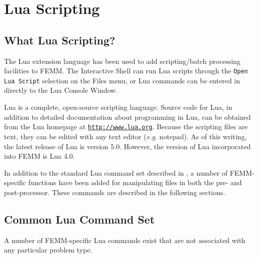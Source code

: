 %

\chapter{Lua Scripting}

\section{What Lua Scripting?}

The Lua extension language has been used to add scripting/batch
processing facilities to FEMM. The Interactive Shell can run Lua scripts
through the {\tt Open Lua Script} selection on the Files menu, or Lua commands can be
entered in directly to the Lua Console Window.

Lua is a complete, open-source scripting language.  Source code for
Lua, in addition to detailed documentation about programming in
Lua, can be obtained from the Lua homepage at
\href{http://www.lua.org}{\tt http://www.lua.org}. 
Because the
scripting files are text, they can be edited with any text editor
({\em e.g.} notepad). As of this writing, the latest release of Lua
is version 5.0. However, the version of Lua incorporated into FEMM
is Lua 4.0.

In addition to the standard Lua command set described in \cite{luaman}, a number of
FEMM-specific functions have been added for manipulating files in
both the pre- and post-processor.  These commands are described in
the following sections.

\section{Common Lua Command Set}

A number of FEMM-specific Lua commands exist that are not
associated with any particular problem type.

